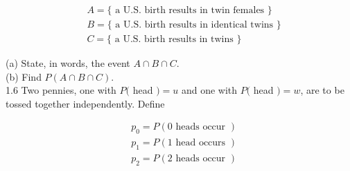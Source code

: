 \documentclass[10pt]{article}
\begin{document}
$$
\begin{aligned}
& A=\{\text { a U.S. birth results in twin females }\} \\
& B=\{\text { a U.S. birth results in identical twins }\} \\
& C=\{\text { a U.S. birth results in twins }\}
\end{aligned}
$$

(a) State, in words, the event $A \cap B \cap C$.\\
(b) Find $P(A \cap B \cap C)$.\\
1.6 Two pennies, one with $P($ head $)=u$ and one with $P($ head $)=w$, are to be tossed together independently. Define

$$
\begin{aligned}
& p_{0}=P(0 \text { heads occur }) \\
& p_{1}=P(1 \text { head occurs }) \\
& p_{2}=P(2 \text { heads occur })
\end{aligned}
$$
\end{document}
